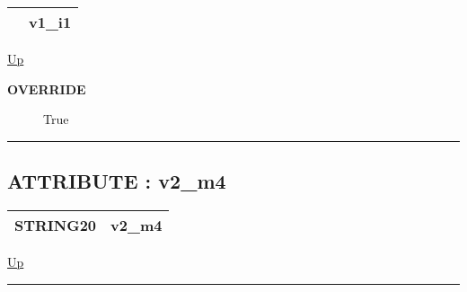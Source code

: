 {\renewcommand{\arraystretch}{1.5}
\begin{tabularx}{\textwidth}{|>{\raggedright\arraybackslash}l|X|}
\hline
\hspace{0pt} & v1\_i1 \\
\hline
\end{tabularx}
}

\hyperlink{ecldoc:intest.inintest.example_2.mod_4}{Up}

\par

\par
\begin{description}
\item [\textbf{OVERRIDE}] True
\end{description}

\rule{\textwidth}{0.4pt}
\subsection*{ATTRIBUTE : v2\_m4}
\hypertarget{ecldoc:intest.inintest.example_2.mod_4.v2_m4}{}

{\renewcommand{\arraystretch}{1.5}
\begin{tabularx}{\textwidth}{|>{\raggedright\arraybackslash}l|X|}
\hline
\hspace{0pt}STRING20 & v2\_m4 \\
\hline
\end{tabularx}
}

\hyperlink{ecldoc:intest.inintest.example_2.mod_4}{Up}

\par


\rule{\textwidth}{0.4pt}




